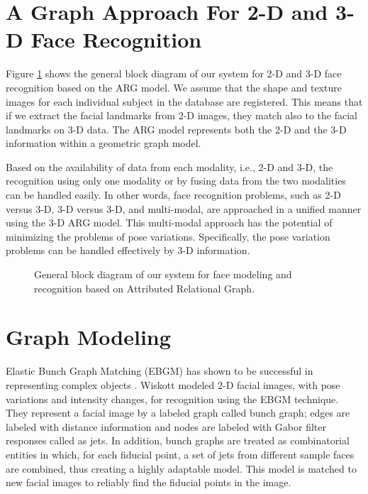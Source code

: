 \section{A Graph Approach For 2-D and 3-D Face Recognition}
Figure \ref{fig_proposed_work} shows the general block diagram of
our system for 2-D and 3-D face recognition based on the ARG model.
We assume that the shape and texture images for each individual
subject in the database are registered. This means that if we
extract the facial landmarks from 2-D images, they match also to the
facial landmarks on 3-D data. The ARG model represents both the 2-D
and the 3-D information within a geometric graph model.

Based on the availability of data from each modality, i.e., 2-D and
3-D, the recognition using only one modality or by fusing data from
the two modalities can be handled easily. In other words, face
recognition problems, such as 2-D versus 3-D, 3-D versus 3-D, and
multi-modal, are approached in a unified manner using the 3-D ARG
model. This multi-modal approach has the potential of minimizing the
problems of pose variations. Specifically, the pose variation
problems can be handled effectively by 3-D information.

\begin{figure}[tbp]
\begin{center}
\vskip -1in \caption{General block diagram of our system for face
modeling and recognition based on Attributed Relational Graph.}
\label{fig_proposed_work}
\end{center}
\end{figure}

\section{Graph Modeling} \label{sec_2-D} Elastic Bunch Graph
Matching (EBGM) has shown to be successful in representing complex
objects \cite{Wiskott97, bolme_03}. Wiskott \cite{Wiskott97} modeled
2-D facial images, with pose variations and intensity changes, for
recognition using the EBGM technique. They represent a facial image
by a labeled graph called bunch graph; edges are labeled with
distance information and nodes are labeled with Gabor filter
responses called as jets. In addition, bunch graphs are treated as
combinatorial entities in which, for each fiducial point, a set of
jets from different sample faces are combined, thus creating a
highly adaptable model. This model is matched to new facial images
to reliably find the fiducial points in the image.

